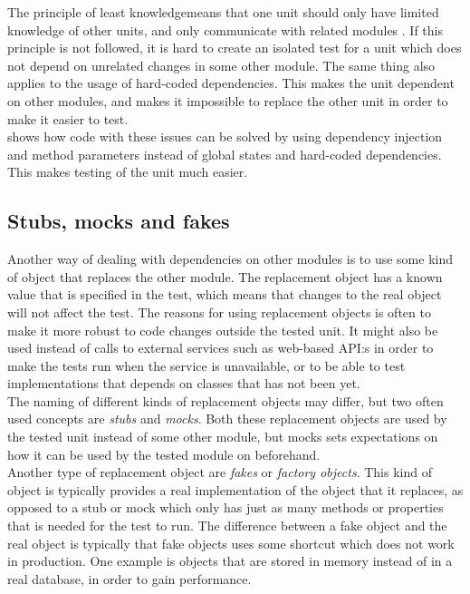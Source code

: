 The principle of least knowledge\footnotemark means that one unit should
only have limited knowledge of other units, and only communicate with
related modules \cite{wiki:demeter}. If this principle is not followed,
it is hard to create an isolated test for a unit which does not depend
on unrelated changes in some other module. The same thing also applies
to the usage of hard-coded dependencies. This makes the unit dependent
on other modules, and makes it impossible to replace the other unit
in order to make it easier to test.\\

\citeauthor{video:misko_psychology} shows how code with these issues can
be solved by using dependency injection and method parameters instead
of global states and hard-coded dependencies. This makes testing of the
unit much easier.\\


\subsection{Stubs, mocks and fakes}

Another way of dealing with dependencies on other modules is to use some
kind of object that replaces the other module. The replacement object
has a known value that is specified in the test, which means that
changes to the real object will not affect the test. The reasons for
using replacement objects is often to make it more robust to code
changes outside the tested unit. It might also be used instead of calls
to external services such as web-based API:s in order to make the tests
run when the service is unavailable, or to be able to test
implementations that depends on classes that has not been yet.\\

The naming of different kinds of replacement objects may differ, but two
often used concepts are \emph{stubs} and \emph{mocks}. Both these
replacement objects are used by the tested unit instead of some other
module, but mocks sets expectations on how it can be used by the tested
module on beforehand. \cite{web:mocks_arent_stubs}\\

Another type of replacement object are \emph{fakes} or \emph{factory
objects}. This kind of object is typically provides a real
implementation of the object that it replaces, as opposed to a stub or
mock which only has just as many methods or properties that is needed
for the test to run. The difference between a fake object and the real
object is typically that fake objects uses some shortcut which does not
work in production. One example is objects that are stored in memory
instead of in a real database, in order to gain performance.
\cite{web:mocks_arent_stubs}\\

